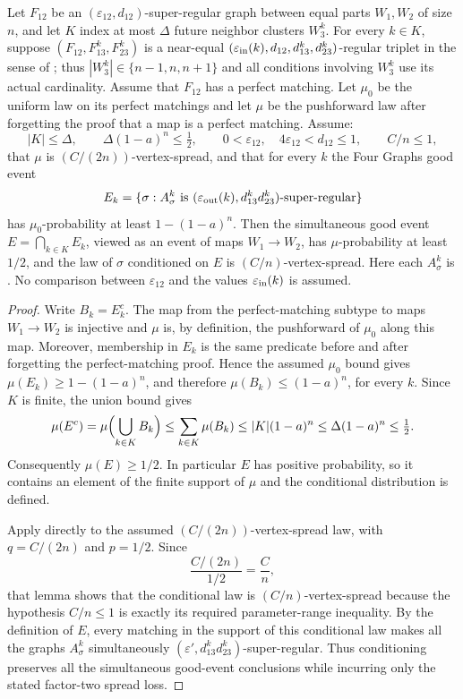 \begin{lemma}
Let $F_{12}$ be an $(\varepsilon_{12},d_{12})$-super-regular graph between equal parts $W_1,W_2$ of size $n$, and let $K$ index at most $\Delta$ future neighbor clusters $W_3^k$. For every $k\in K$, suppose $(F_{12},F_{13}^k,F_{23}^k)$ is a near-equal $(\varepsilon_{\rm in}(k),d_{12},d_{13}^k,d_{23}^k)$-regular triplet in the sense of ; thus $|W_3^k|\in\{n-1,n,n+1\}$ and all conditions involving $W_3^k$ use its actual cardinality. Assume that $F_{12}$ has a perfect matching. Let $\mu_0$ be the uniform law on its perfect matchings and let $\mu$ be the pushforward law after forgetting the proof that a map is a perfect matching. Assume:
\[
 |K|\leq\Delta,\qquad \Delta(1-a)^n\leq\tfrac12,
 \qquad 0<\varepsilon_{12},\quad4\varepsilon_{12}<d_{12}\leq1,
 \qquad C/n\leq1,
\]
that $\mu$ is $(C/(2n))$-vertex-spread, and that for every $k$ the Four Graphs good event
\[
 E_k=\{\sigma:A^k_\sigma\text{ is }(\varepsilon_{\rm out}(k),d_{13}^kd_{23}^k)\text{-super-regular}\}
\]
has $\mu_0$-probability at least $1-(1-a)^n$. Then the simultaneous good event $E=\bigcap_{k\in K}E_k$, viewed as an event of maps $W_1\to W_2$, has $\mu$-probability at least $1/2$, and the law of $\sigma$ conditioned on $E$ is $(C/n)$-vertex-spread. Here each $A^k_\sigma$ is . No comparison between $\varepsilon_{12}$ and the values $\varepsilon_{\rm in}(k)$ is assumed.
\end{lemma}
\begin{proof}
Write $B_k=E_k^c$. The map from the perfect-matching subtype to maps
$W_1\to W_2$ is injective and $\mu$ is, by definition, the pushforward of
$\mu_0$ along this map. Moreover, membership in $E_k$ is the same predicate
before and after forgetting the perfect-matching proof. Hence the assumed
$\mu_0$ bound gives $\mu(E_k)\geq1-(1-a)^n$, and therefore
$\mu(B_k)\leq(1-a)^n$, for every $k$. Since $K$ is finite, the union bound gives
\[
 \mu(E^c)=\mu\Bigl(\bigcup_{k\in K}B_k\Bigr)
 \leq\sum_{k\in K}\mu(B_k)
 \leq |K|(1-a)^n
 \leq\Delta(1-a)^n\leq\tfrac12.
\]
Consequently $\mu(E)\geq1/2$.  In particular $E$ has positive probability, so it contains an element of the finite support of $\mu$ and the conditional distribution is defined.

Apply  directly to the assumed $(C/(2n))$-vertex-spread law, with $q=C/(2n)$ and $p=1/2$.  Since
\[
 \frac{C/(2n)}{1/2}=\frac Cn,
\]
that lemma shows that the conditional law is $(C/n)$-vertex-spread because the hypothesis $C/n\leq1$ is exactly its required parameter-range inequality.  By the definition of $E$, every matching in the support of this conditional law makes all the graphs $A^k_\sigma$ simultaneously $(\varepsilon',d_{13}^kd_{23}^k)$-super-regular.  Thus conditioning preserves all the simultaneous good-event conclusions while incurring only the stated factor-two spread loss.
\end{proof}
